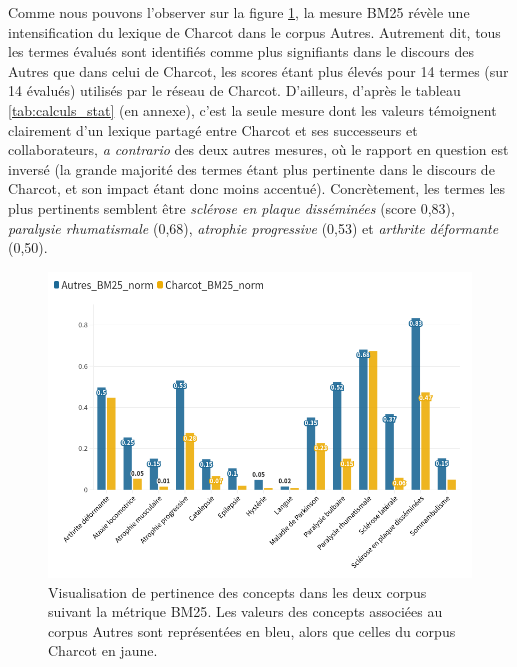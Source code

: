 Comme nous pouvons l'observer sur la figure \ref{fig:bm25}, la mesure \textsc{BM25} révèle une intensification du lexique de Charcot dans le corpus \og{}Autres\fg{}. Autrement dit, tous les termes évalués sont identifiés comme plus signifiants dans le discours des \og{}Autres\fg{} que dans celui de Charcot, les scores étant plus élevés pour 14 termes (sur 14 évalués) utilisés par le réseau de Charcot. D'ailleurs, d'après le tableau \ref{tab:calculs_stat} (en annexe), c'est la seule mesure dont les valeurs témoignent clairement d'un lexique partagé entre Charcot et ses successeurs et collaborateurs, \textit{a contrario} des deux autres mesures, où le rapport en question est inversé (la grande majorité des termes étant plus pertinente dans le discours de Charcot, et son impact étant donc moins accentué). Concrètement, les termes les plus pertinents semblent être \textit{sclérose en plaque disséminées} (score 0,83), \textit{paralysie rhumatismale} (0,68), \textit{atrophie progressive} (0,53) et \textit{arthrite déformante} (0,50).

\begin{figure}[!h]
    \centering
    \includegraphics[width=1\textwidth]{img/Charcot_Autres_250523.png}
    \caption{Visualisation de pertinence des concepts dans les deux corpus suivant la métrique \textsc{BM25}. Les valeurs des concepts associées au corpus \og{}Autres\fg{} sont représentées en bleu, alors que celles du corpus \og{}Charcot\fg{} en jaune.}
    \label{fig:bm25}
\end{figure}


